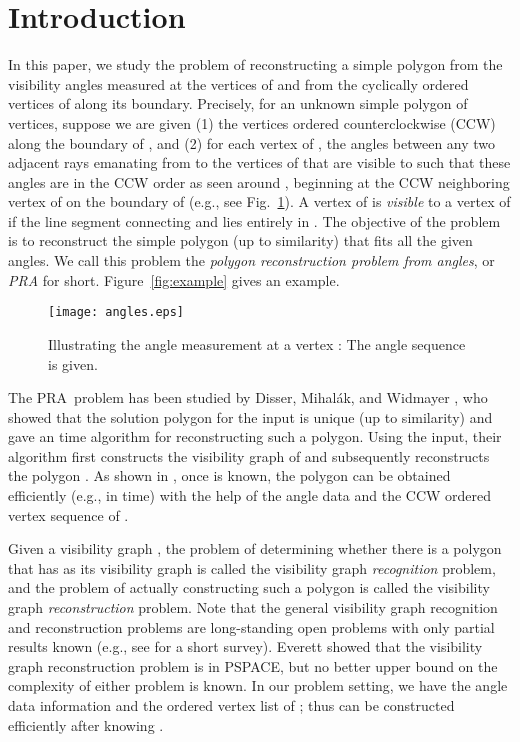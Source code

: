 \documentclass[11pt]{article}
\def\pra{PRA}
\begin{document}
\section{Introduction}
\label{sec:intro}
In this paper, we study the problem of reconstructing a simple polygon 
from the visibility angles measured at the vertices of  and
from the cyclically ordered vertices of  along its boundary. 
Precisely, for an unknown simple polygon
 of  vertices, suppose we are given (1) the vertices ordered 
counterclockwise (CCW) along the boundary 
of , and (2) for each vertex  of , the angles
between any two adjacent rays emanating from  to the vertices of
 that are visible to  such that these angles
are in the CCW order as seen around , beginning
at the CCW neighboring vertex of  on the boundary of  (e.g., see
Fig.~\ref{fig:angles}). 
A vertex  of  is {\em visible} to a vertex  of  if the
line segment connecting  and  lies entirely in .
The objective of the problem is to reconstruct the simple polygon  (up
to similarity) that fits all the
given angles. We call this problem the {\em polygon
reconstruction problem from angles}, or {\em PRA} for short. 
Figure~\ref{fig:example} gives an example. 




\begin{figure}[t]
\begin{minipage}[t]{\linewidth}
\begin{center}
\texttt{[image: angles.eps]}
\caption{\footnotesize Illustrating the angle measurement at a
vertex : The angle sequence 
is given. 
}\label{fig:angles}
\end{center}
\end{minipage}
\end{figure}

The \pra\ problem has been studied by Disser, Mihal\'ak, and Widmayer 
\cite{ref:DisserRe10}, who showed that the solution polygon 
for the input is unique (up to similarity) and gave an  
time algorithm for reconstructing such a polygon. Using the input, 
their algorithm first constructs the visibility graph  of  and
subsequently reconstructs the polygon . As shown in 
\cite{ref:DisserRe10}, once  is known, the polygon  can be 
obtained efficiently (e.g., in  time) with the help of the angle data 
and the CCW ordered vertex sequence of . 

Given a visibility
graph , the problem of determining whether there is a polygon 
that has  as its visibility graph is called the visibility graph
{\em recognition} problem, and the problem of actually constructing
such a polygon  is called the visibility graph {\em reconstruction} problem. 
Note that the general visibility graph recognition and reconstruction
problems are long-standing open problems with only partial results known
(e.g., see \cite{ref:AsanoVi00} for a short survey). Everett
\cite{ref:EverettVi90} showed that the visibility graph reconstruction
problem is in PSPACE, but no better upper bound on the complexity of
either problem is known. In our problem setting, we have the
angle data information and the ordered vertex list of ; thus
 can be constructed efficiently after knowing . 
\end{document}
